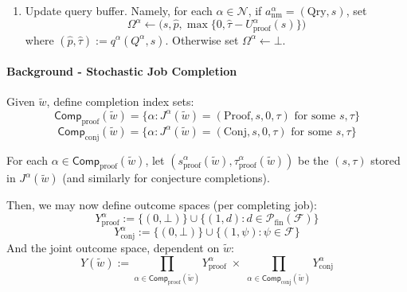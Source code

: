 \begin{enumerate}
Then propagate public additions to each private library to maintain the invariant $\mathcal L^0\subseteq \mathcal L^\beta$:
\[\mathcal C^\beta \leftarrow \mathcal C^\beta \cup (\mathcal C^0\setminus \mathcal C^0_{\text{old}})\]\[
\mathcal{RS}^\beta \leftarrow \mathcal{RS}^\beta \cup (\mathcal{RS}^0\setminus \mathcal{RS}^0_{\text{old}})\]
Also update for all $s\in \mathcal{RS}^0 \setminus \mathcal{RS}^0_\mathrm{old}$:
 \[\delta^\beta(s)\leftarrow\delta^0(s),\qquad \Theta^\beta(s)\leftarrow\Theta^0(s)\]
 \[Q^\beta \leftarrow \Delta^\beta(Q^\beta,(s,\Theta^0(s)))\]
 


\item Update query buffer. Namely, for each $\alpha\in\mathcal{N}$, if $a^\alpha_{\mathrm{nm}}=(\mathrm{Qry},s)$, set
\[\Omega^\alpha \leftarrow \big(s,\hat p,\max\{0,\hat\tau-U^\alpha_{\mathrm{proof}}(s)\}\big)\]
where $(\hat p,\hat\tau):=q^\alpha(Q^\alpha,s)$. Otherwise set $\Omega^\alpha\leftarrow \bot$.

\end{enumerate}

\paragraph{Background - Stochastic Job Completion}

Given $\tilde w$, define completion index sets:
\[
    \mathsf{Comp}_{\mathrm{proof}}(\tilde w) = \{\alpha : J^\alpha(\tilde w)=(\mathrm{Proof},s,0,\tau)\text{ for some }s,\tau\}
\]
\[\mathsf{Comp}_{\mathrm{conj}}(\tilde w) = \{\alpha : J^\alpha(\tilde w)=(\mathrm{Conj},s,0,\tau)\text{ for some }s,\tau\}\]

For each $\alpha\in \mathsf{Comp}_{\mathrm{proof}}(\tilde w)$, let $(s^\alpha_{\mathrm{proof}}(\tilde w),\tau^\alpha_{\mathrm{proof}}(\tilde w))$ be the $(s,\tau)$ stored in $J^\alpha(\tilde w)$ (and similarly for conjecture completions).

Then, we may now define outcome spaces (per completing job):
\[Y^{\alpha}_{\mathrm{proof}} := \{(0,\bot)\}\cup\{(1,d): d\in\mathcal P_{\mathrm{fin}}(\mathcal F)\}\]
\[Y^{\alpha}_{\mathrm{conj}} := \{(0,\bot)\}\cup\{(1,\psi): \psi\in\mathcal F\}\]
And the joint outcome space, dependent on $\tilde w$:
\[Y(\tilde w)
:=
\prod_{\alpha\in\mathsf{Comp}_{\mathrm{proof}}(\tilde w)} Y^{\alpha}_{\mathrm{proof}}
\;\times\;
\prod_{\alpha\in\mathsf{Comp}_{\mathrm{conj}}(\tilde w)} Y^{\alpha}_{\mathrm{conj}}\]

